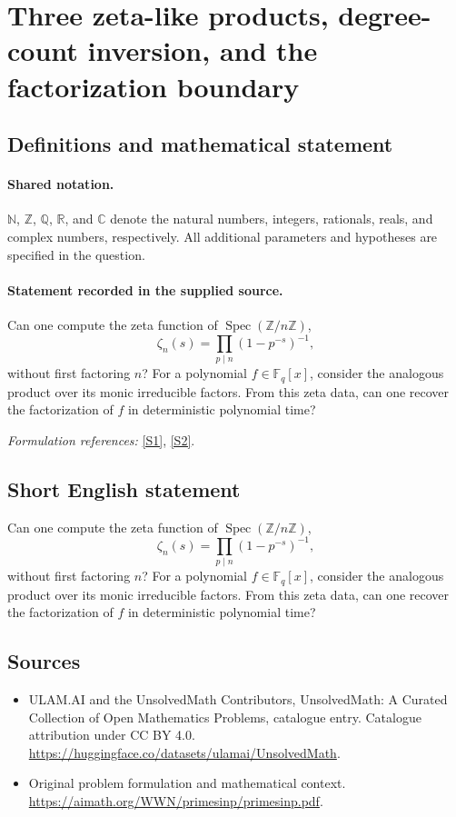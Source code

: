 \documentclass[11pt]{article}
\newcommand{\sref}[2]{\hyperlink{source:#1:#2}{[S#2]}}
\begin{document}
\section{Three zeta-like products, degree-count inversion, and the factorization boundary}\label{statement}

\subsection{Definitions and mathematical statement}

\paragraph{Shared notation.}$\mathbb N$, $\mathbb Z$, $\mathbb Q$, $\mathbb R$, and $\mathbb C$ denote the natural numbers, integers, rationals, reals, and complex numbers, respectively. All additional parameters and hypotheses are specified in the question.


\paragraph{Statement recorded in the supplied source.}
Can one compute the zeta function of $\operatorname{Spec}(\mathbb Z/n\mathbb Z)$,
\[\zeta_n(s)=\prod_{p\mid n}(1-p^{-s})^{-1},\]
without first factoring $n$? For a polynomial $f\in\mathbb F_q[x]$, consider the analogous product over its monic irreducible factors. From this zeta data, can one recover the factorization of $f$ in deterministic polynomial time?
\par\smallskip\textit{Formulation references:} \sref{statement}{1}, \sref{statement}{2}.
\subsection{Short English statement}
Can one compute the zeta function of $\operatorname{Spec}(\mathbb Z/n\mathbb Z)$,
\[\zeta_n(s)=\prod_{p\mid n}(1-p^{-s})^{-1},\]
without first factoring $n$? For a polynomial $f\in\mathbb F_q[x]$, consider the analogous product over its monic irreducible factors. From this zeta data, can one recover the factorization of $f$ in deterministic polynomial time?
\subsection{Sources}
\begin{itemize}
\item[\hypertarget{source:statement:1}{S1}] ULAM.AI and the UnsolvedMath Contributors, UnsolvedMath: A Curated Collection of Open Mathematics Problems, catalogue entry. Catalogue attribution under CC BY 4.0.
\url{https://huggingface.co/datasets/ulamai/UnsolvedMath}.
\item[\hypertarget{source:statement:2}{S2}] Original problem formulation and mathematical context.
\url{https://aimath.org/WWN/primesinp/primesinp.pdf}.
\end{itemize}
\label{end:statement}
\end{document}
